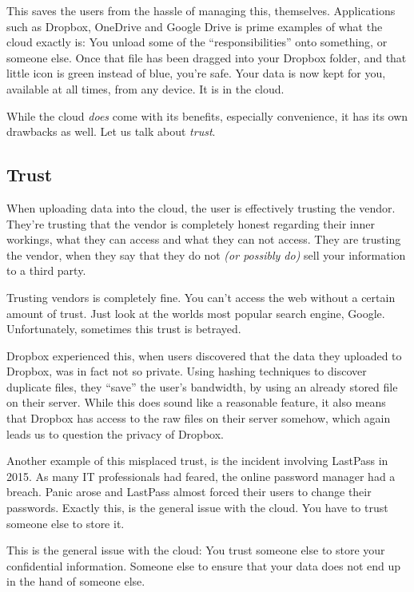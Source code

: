 		This saves the users from the hassle of managing this, themselves. Applications such as Dropbox, OneDrive and Google Drive is prime examples of what the cloud exactly is: You unload some of the ``responsibilities'' onto something, or someone else. Once that file has been dragged into your Dropbox folder, and that little icon is green instead of blue, you're safe. Your data is now kept for you, available at all times, from any device. It is in the cloud.

		While the cloud \emph{does} come with its benefits, especially convenience, it has its own drawbacks as well. Let us talk about \emph{trust}.

		\subsection*{Trust}
			When uploading data into the cloud, the user is effectively trusting the vendor. They're trusting that the vendor is completely honest regarding their inner workings, what they can access and what they can not access. They are trusting the vendor, when they say that they do not \emph{(or possibly do)} sell your information to a third party.

			Trusting vendors is completely fine. You can't access the web without a certain amount of trust. Just look at the worlds most popular search engine, Google. Unfortunately, sometimes this trust is betrayed.

			Dropbox experienced this, when users discovered that the data they uploaded to Dropbox, was in fact not so private. Using hashing techniques to discover duplicate files, they ``save'' the user's bandwidth, by using an already stored file on their server. While this does sound like a reasonable feature, it also means that Dropbox has access to the raw files on their server somehow, which again leads us to question the privacy of Dropbox.

			Another example of this misplaced trust, is the incident involving LastPass in 2015. As many IT professionals had feared, the online password manager had a breach. Panic arose and LastPass almost forced their users to change their passwords. Exactly this, is the general issue with the cloud. You have to trust someone else to store it.

			This is the general issue with the cloud: You trust someone else to store your confidential information. Someone else to ensure that your data does not end up in the hand of someone else.

